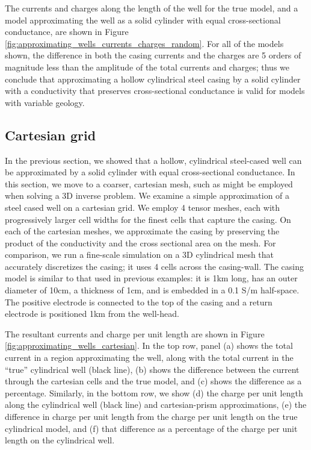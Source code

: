 

The currents and charges along the length of the well for the true model, and a model approximating the well as a solid cylinder with equal cross-sectional conductance, are shown in Figure \ref{fig:approximating_wells_currents_charges_random}. For all of the models shown, the difference in both the casing currents and the charges are 5 orders of magnitude less than the amplitude of the total currents and charges; thus we conclude that approximating a hollow cylindrical steel casing by a solid cylinder with a conductivity that preserves cross-sectional conductance is valid for models with variable geology.



\subsection{Cartesian grid}
In the previous section, we showed that a hollow, cylindrical steel-cased well can be approximated by a solid cylinder with equal cross-sectional conductance. In this section, we move to a coarser, cartesian mesh, such as might be employed when solving a 3D inverse problem. We examine a simple approximation of a steel cased well on a cartesian grid. We employ 4 tensor meshes, each with progressively larger cell widths for the finest cells that capture the casing. On each of the cartesian meshes, we approximate the casing by preserving the product of the conductivity and the cross sectional area on the mesh. For comparison, we run a fine-scale simulation on a 3D cylindrical mesh that accurately discretizes the casing; it uses 4 cells across the casing-wall. The casing model is similar to that used in previous examples: it is 1km long, has an outer diameter of 10cm, a thickness of 1cm, and is embedded in a 0.1 S/m half-space. The positive electrode is connected to the top of the casing and a return electrode is positioned 1km from the well-head.

The resultant currents and charge per unit length are shown in Figure \ref{fig:approximating_wells_cartesian}. In the top row, panel (a) shows the total current in a region approximating the well, along with the total current in the ``true'' cylindrical well (black line), (b) shows the difference between the current through the cartesian cells and the true model, and (c) shows the difference as a percentage. Similarly, in the bottom row, we show (d) the charge per unit length along the cylindrical well (black line) and cartesian-prism approximations, (e) the difference in charge per unit length from the charge per unit length on the true cylindrical model, and (f) that difference as a percentage of the charge per unit length on the cylindrical well.


